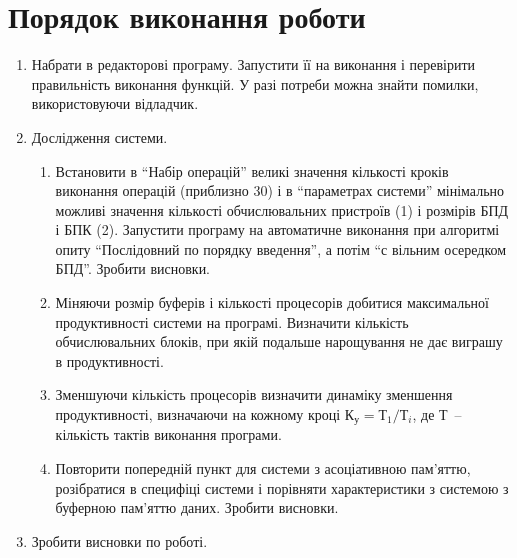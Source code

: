 \documentclass[a4paper, 10pt]{article}
\begin{document}
\section{Порядок виконання роботи}
\begin{enumerate}
    \item Набрати в редакторові програму. Запустити її на виконання і перевірити правильність виконання функцій. У разі потреби можна знайти помилки, використовуючи відладчик.
    \item {
	Дослідження системи.
	\begin{enumerate}
	    \item Встановити в ``Набір операцій'' великі значення кількості кроків виконання операцій (приблизно 30) і в ``параметрах системи'' мінімально можливі значення кількості обчислювальних пристроїв (1) і розмірів БПД і БПК (2). Запустити програму на автоматичне виконання при алгоритмі опиту ``Послідовний по порядку введення'', а потім ``с вільним осередком БПД''. Зробити висновки.

	    \item Міняючи розмір буферів і кількості процесорів добитися максимальної продуктивності системи на програмі. Визначити кількість обчислювальних блоків, при якій подальше нарощування не дає виграшу в продуктивності.

	    \item Зменшуючи кількість процесорів визначити динаміку зменшення продуктивності, визначаючи на кожному кроці $К_{у} = Т_{1} / Т_{i}$, де $Т$~-- кількість тактів виконання програми.

	    \item Повторити попередній пункт для системи з асоціативною пам'яттю, розібратися в специфіці системи і порівняти характеристики з  системою з буферною пам'яттю даних. Зробити висновки.
	\end{enumerate}
}

	\item Зробити висновки по роботі.
\end{enumerate}
\end{document}

